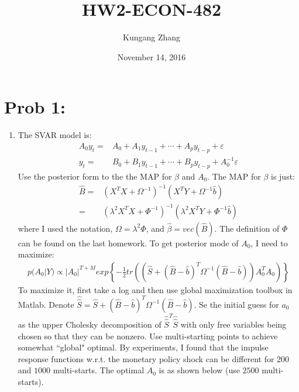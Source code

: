 \documentclass[11pt, oneside]{article}   	%
\title{HW2-ECON-482}
\author{Kungang Zhang}
\date{November 14, 2016}							%
\begin{document}
\maketitle
\section{Prob 1:}
\begin{enumerate}[(1)]
\item
The SVAR model is:
\begin{align}
A_0 y_t =& A_0 + A_1 y_{t-1}+\cdots+A_{p} y_{t-p} + \varepsilon \\
y_t =& B_0 + B_1 y_{t-1}+\cdots+B_{p} y_{t-p} + A_0^{-1}\varepsilon
\label{model:SVAR}
\end{align}
Use the posterior form to the the MAP for $ \beta$ and $ A_0$. The MAP for $ \beta$ is just:
\begin{align}
\hat{ B} =& (X^TX + \Omega ^{-1}) ^{-1} (X^T Y + \Omega ^{-1} \hat{b}) \nonumber \\
=& ( \lambda^2 X^TX + \Phi ^{-1}) ^{-1} ( \lambda^2 X^T Y + \Phi ^{-1} \hat{b}) 
\label{eqn:post_B}
\end{align}
where I used the notation, $ \Omega = \lambda^2 \Phi$, and $\hat{ \beta} = vec(\hat{B})$. The definition of $ \Phi$ can be found on the last homework.
To get posterior mode of $A_0$, I need to maximize:
\begin{align}
p(A_0 | Y) \propto |A_0| ^{T+M} exp\left\{-\frac{1}{2} tr \left( \left( \hat{S} + \left( \hat{B} - \hat{b} \right)^T \Omega ^{-1} \left( \hat{B} - \hat{b} \right) \right)A_0^T A_0  \right) \right\}
\label{eqn:post_A0}
\end{align}
To maximize it, first take a log and then use global maximization toolbox in Matlab. Denote $\hat{\hat{S}} =  \hat{S} + \left( \hat{B} - \hat{b} \right)^T \Omega ^{-1} \left( \hat{B} - \hat{b}\right)$. Se the initial guess for $a_0$ as the upper Cholesky decomposition of $\hat{\hat{S}}^T\hat{\hat{S}}$ with only free variables being chosen so that they can be nonzero. Use multi-starting points to achieve somewhat ``global" optimal. By experiments, I found that the impulse response functions w.r.t. the monetary policy shock can be different for $200$ and $1000$ multi-starts. The optimal $A_0$ is as shown below (use $2500$ multi-starts).

    

\end{enumerate}
\end{document}
